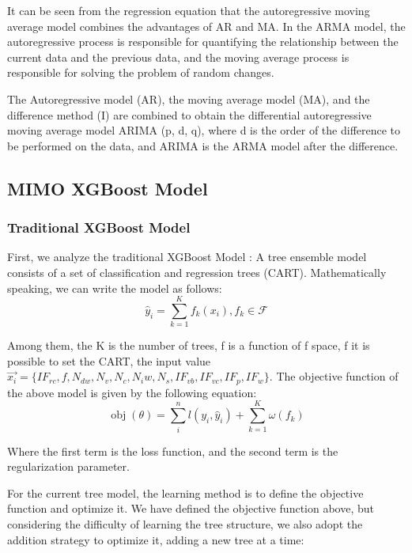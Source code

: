 \documentclass[a4paper]{jpconf}
\begin{document}
It can be seen from the regression equation that the autoregressive moving average model combines the advantages of AR and MA. In the ARMA model, the autoregressive process is responsible for quantifying the relationship between the current data and the previous data, and the moving average process is responsible for solving the problem of random changes.

The Autoregressive model (AR), the moving average model (MA), and the difference method (I) are combined to obtain the differential autoregressive moving average model ARIMA (p, d, q), where d is the order of the difference to be performed on the data, and ARIMA \cite{kalpakis2001distance} is the ARMA model after the difference.








\subsection{MIMO XGBoost Model}

\subsubsection{Traditional XGBoost Model}
First, we analyze the traditional XGBoost Model \cite{chen2016xgboost}: A tree ensemble model consists of a set of classification and regression trees (CART). Mathematically speaking, we can write the model as follows:
\begin{equation}\label{eq:1}
    \hat{y}_{i}=\sum_{k=1}^{K} f_{k}\left(x_{i}\right), f_{k} \in \mathcal{F}
\end{equation}

Among them, the K is the number of trees, f is a function of f space, f it is possible to set the CART, the input value $\vec{x_i}=\{IF_{rc},f,N_{dw},N_v,N_c,N_iw,N_s,IF_{vb},IF_{vc},IF_p,IF_w\}$. The objective function of the above model is given by the following equation:
\begin{equation}\label{eq:3}
    \operatorname{obj}(\theta)=\sum_{i}^{n} l\left(y_{i}, \hat{y}_{i}\right)+\sum_{k=1}^{K} \omega\left(f_{k}\right)
\end{equation}

Where the first term is the loss function, and the second term is the regularization parameter.


For the current tree model, the learning method is to define the objective function and optimize it. We have defined the objective function above, but considering the difficulty of learning the tree structure, we also adopt the addition strategy to optimize it, adding a new tree at a time:
\end{document}
